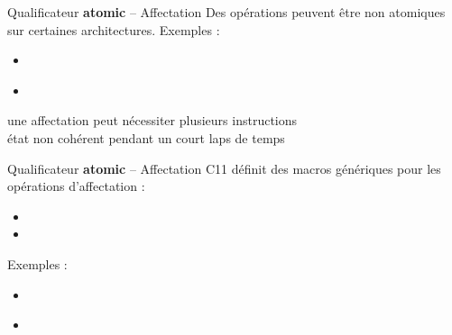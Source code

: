 \begin {frame} {Qualificateur \textbf {atomic} -- Affectation}
    Des opérations peuvent être non atomiques sur certaines
    architectures.  Exemples :

    \begin {itemize}
	\item {} \\
	\item {} \\
    \end {itemize}

    \implique une affectation peut nécessiter plusieurs instructions \\
    \implique état non cohérent pendant un court laps de temps
\end {frame}

\begin {frame} {Qualificateur \textbf {atomic} -- Affectation}
    C11 définit des macros génériques pour les opérations d'affectation :

    \begin {itemize}
	\item {}
	\item {}
    \end {itemize}

    Exemples :

    \begin {itemize}
	\item {}
	\item {} \\
    \end {itemize}

\end {frame}

